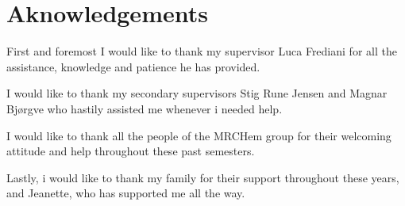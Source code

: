 \documentclass[../master_thesis.tex]{subfiles}
\begin{document}
\chapter{Aknowledgements}
First and foremost I would like to thank my supervisor Luca Frediani for all the
assistance, knowledge and patience he has provided.

I would like to thank my secondary supervisors Stig Rune Jensen and Magnar Bjørgve
who hastily assisted me whenever i needed help.

I would like to thank all the people of the MRCHem group for their welcoming attitude
and help throughout these past semesters.

Lastly, i would like to thank my family for their support throughout these years,
and Jeanette, who has supported me all the way.

\biblio
\end{document}
